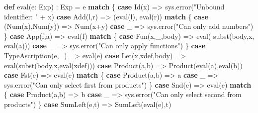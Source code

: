 \documentclass[]{article}
\newenvironment{Shaded}{}{}
\newcommand{\FunctionTok}[1]{\textcolor[rgb]{0.02,0.16,0.49}{#1}}
\newcommand{\KeywordTok}[1]{\textcolor[rgb]{0.00,0.44,0.13}{\textbf{#1}}}
\newcommand{\NormalTok}[1]{#1}
\newcommand{\StringTok}[1]{\textcolor[rgb]{0.25,0.44,0.63}{#1}}
\begin{document}
\begin{Shaded}
\begin{Highlighting}[]
\KeywordTok{def} \FunctionTok{eval}\NormalTok{(e: Exp) : Exp = e }\KeywordTok{match}\NormalTok{ \{}
  \KeywordTok{case} \FunctionTok{Id}\NormalTok{(x) =\textgreater{} sys.}\FunctionTok{error}\NormalTok{(}\StringTok{"Unbound identifier: "}\NormalTok{ + x)}
  \KeywordTok{case} \FunctionTok{Add}\NormalTok{(l,r) =\textgreater{} (}\FunctionTok{eval}\NormalTok{(l), }\FunctionTok{eval}\NormalTok{(r)) }\KeywordTok{match}\NormalTok{ \{}
    \KeywordTok{case}\NormalTok{ (}\FunctionTok{Num}\NormalTok{(x),}\FunctionTok{Num}\NormalTok{(y)) =\textgreater{} }\FunctionTok{Num}\NormalTok{(x+y)}
    \KeywordTok{case}\NormalTok{ \_ =\textgreater{} sys.}\FunctionTok{error}\NormalTok{(}\StringTok{"Can only add numbers"}\NormalTok{)}
\NormalTok{  \}}
  \KeywordTok{case} \FunctionTok{App}\NormalTok{(f,a) =\textgreater{} }\FunctionTok{eval}\NormalTok{(f) }\KeywordTok{match}\NormalTok{ \{}
    \KeywordTok{case} \FunctionTok{Fun}\NormalTok{(x,\_,body) =\textgreater{} }\FunctionTok{eval}\NormalTok{( }\FunctionTok{subst}\NormalTok{(body,x, }\FunctionTok{eval}\NormalTok{(a)))}
    \KeywordTok{case}\NormalTok{ \_ =\textgreater{} sys.}\FunctionTok{error}\NormalTok{(}\StringTok{"Can only apply functions"}\NormalTok{)}
\NormalTok{  \}}
  \KeywordTok{case} \FunctionTok{TypeAscription}\NormalTok{(e,\_) =\textgreater{} }\FunctionTok{eval}\NormalTok{(e)}
  \KeywordTok{case} \FunctionTok{Let}\NormalTok{(x,xdef,body) =\textgreater{} }\FunctionTok{eval}\NormalTok{(}\FunctionTok{subst}\NormalTok{(body,x,}\FunctionTok{eval}\NormalTok{(xdef)))}
  \KeywordTok{case} \FunctionTok{Product}\NormalTok{(a,b) =\textgreater{} }\FunctionTok{Product}\NormalTok{(}\FunctionTok{eval}\NormalTok{(a),}\FunctionTok{eval}\NormalTok{(b))}
  \KeywordTok{case} \FunctionTok{Fst}\NormalTok{(e) =\textgreater{} }\FunctionTok{eval}\NormalTok{(e) }\KeywordTok{match}\NormalTok{ \{}
    \KeywordTok{case} \FunctionTok{Product}\NormalTok{(a,b) =\textgreater{} a}
    \KeywordTok{case}\NormalTok{ \_ =\textgreater{} sys.}\FunctionTok{error}\NormalTok{(}\StringTok{"Can only select first from products"}\NormalTok{)}
\NormalTok{  \}}
  \KeywordTok{case} \FunctionTok{Snd}\NormalTok{(e) =\textgreater{} }\FunctionTok{eval}\NormalTok{(e) }\KeywordTok{match}\NormalTok{ \{}
    \KeywordTok{case} \FunctionTok{Product}\NormalTok{(a,b) =\textgreater{} b}
    \KeywordTok{case}\NormalTok{ \_ =\textgreater{} sys.}\FunctionTok{error}\NormalTok{(}\StringTok{"Can only select second from products"}\NormalTok{)}
\NormalTok{  \}}
  \KeywordTok{case} \FunctionTok{SumLeft}\NormalTok{(e,t) =\textgreater{} }\FunctionTok{SumLeft}\NormalTok{(}\FunctionTok{eval}\NormalTok{(e),t)}

\end{Highlighting}
\end{Shaded}
\end{document}
